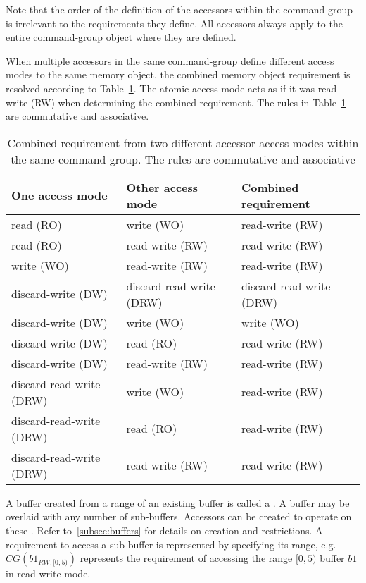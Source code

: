 Note that the order of the definition of the accessors within the 
\gls{command-group} is irrelevant to the requirements they define.
All accessors always apply to the entire \gls{command-group} object where
they are defined.

When multiple \glspl{accessor} in the same \gls{command-group} define different
access modes to the same memory object, the combined memory object requirement is
resolved according to Table~\ref{table.access.mode.union}.
The atomic access mode acts as if it was read-write (RW) when determining the combined requirement.
The rules in Table~\ref{table.access.mode.union} are commutative and associative.

\begin{table}[!h]
\centering
    \begin{tabular}{| p{1.5 in} | p{1.5 in} | p{1.5 in} |}
      \hline
        \cellcolor{lightgray} \textbf{One access mode}
        & \cellcolor{lightgray} \textbf{Other access mode}
        & \cellcolor{lightgray} \textbf{Combined requirement} \\
      \hline
        read (RO) & write (WO) & read-write (RW) \\
        read (RO) & read-write (RW) & read-write (RW) \\
        write (WO) & read-write (RW) & read-write (RW) \\
        discard-write (DW) & discard-read-write (DRW) & discard-read-write (DRW) \\
        discard-write (DW) & write (WO) & write (WO) \\
        discard-write (DW) & read (RO) & read-write (RW) \\
        discard-write (DW) & read-write (RW) & read-write (RW) \\
        discard-read-write (DRW) & write (WO) & read-write (RW) \\
        discard-read-write (DRW) & read (RO) & read-write (RW) \\
        discard-read-write (DRW) & read-write (RW) & read-write (RW) \\
      \hline
    \end{tabular}
    \caption{Combined requirement from two different accessor access modes within the same \gls{command-group}.  The rules are commutative and associative}
    \label{table.access.mode.union}
\end{table}

A buffer created from a range of an existing buffer is called
a .
A buffer may be overlaid with any number of sub-buffers.
Accessors can be created to operate on these . 
Refer to~\ref{subsec:buffers} for details on  
creation and restrictions.
A requirement to access a sub-buffer is represented by specifying its
range, e.g. $CG(b1_{RW,[0,5)})$ represents the requirement of accessing
the range $[0,5)$ buffer $b1$ in read write mode.

